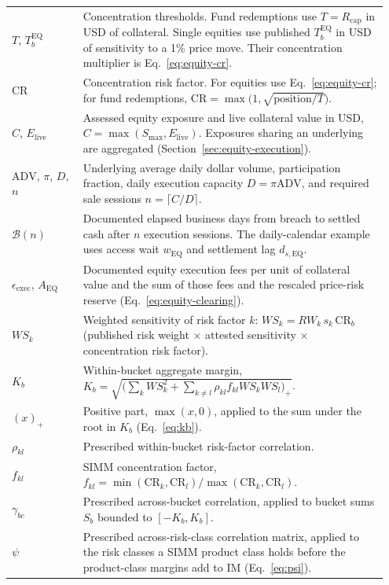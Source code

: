 \begin{longtable}{@{}p{0.18\linewidth} p{0.77\linewidth}@{}}
$T$, $T_b^{\mathrm{EQ}}$ & Concentration thresholds. Fund redemptions use $T = R_{\mathrm{cap}}$ in USD of collateral. Single equities use published $T_b^{\mathrm{EQ}}$ in USD of sensitivity to a 1\% price move. Their concentration multiplier is Eq.~\eqref{eq:equity-cr}.\\
$\mathrm{CR}$ & Concentration risk factor. For equities use Eq.~\eqref{eq:equity-cr}; for fund redemptions, $\mathrm{CR} = \max\!\big(1, \sqrt{\mathrm{position}/T}\big)$.\\
$C$, $E_{\mathrm{live}}$ & Assessed equity exposure and live collateral value in USD, $C=\max(S_{\max},E_{\mathrm{live}})$. Exposures sharing an underlying are aggregated (Section~\ref{sec:equity-execution}).\\
$\mathrm{ADV}$, $\pi$, $D$, $n$ & Underlying average daily dollar volume, participation fraction, daily execution capacity $D=\pi\mathrm{ADV}$, and required sale sessions $n=\lceil C/D\rceil$.\\
$\mathcal{B}(n)$ & Documented elapsed business days from breach to settled cash after $n$ execution sessions. The daily-calendar example uses access wait $w_{\mathrm{EQ}}$ and settlement lag $d_{s,\mathrm{EQ}}$.\\
$\epsilon_{\mathrm{exec}}$, $A_{\mathrm{EQ}}$ & Documented equity execution fees per unit of collateral value and the sum of those fees and the rescaled price-risk reserve (Eq.~\eqref{eq:equity-clearing}).\\
$WS_k$ & Weighted sensitivity of risk factor $k$: $WS_k = RW_k\, s_k\, \mathrm{CR}_b$ (published risk weight $\times$ attested sensitivity $\times$ concentration risk factor).\\
$K_b$ & Within-bucket aggregate margin, $K_b = \sqrt{\bigl(\sum_k WS_k^2 + \sum_{k \ne l} \rho_{kl} f_{kl} WS_k WS_l\bigr)_{\!+}}$.\\
$(x)_+$ & Positive part, $\max(x,0)$, applied to the sum under the root in $K_b$ (Eq.~\eqref{eq:kb}).\\
$\rho_{kl}$ & Prescribed within-bucket risk-factor correlation.\\
$f_{kl}$ & SIMM concentration factor, $f_{kl} = \min(\mathrm{CR}_k,\mathrm{CR}_l)/\max(\mathrm{CR}_k,\mathrm{CR}_l)$.\\
$\gamma_{bc}$ & Prescribed across-bucket correlation, applied to bucket sums $S_b$ bounded to $[-K_b, K_b]$.\\
$\psi$ & Prescribed across-risk-class correlation matrix, applied to the risk classes a SIMM product class holds before the product-class margins add to $\mathrm{IM}$ (Eq.~\eqref{eq:psi}).\\

\end{longtable}
